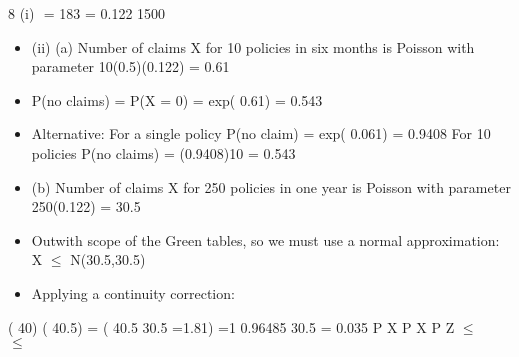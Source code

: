 
8 (i)  = 183 = 0.122
1500

\begin{itemize}
    \item (ii) (a) Number of claims X for 10 policies in six months is Poisson with
parameter 10(0.5)(0.122) = 0.61
\item P(no claims) = P(X = 0) = exp(	0.61) = 0.543
\item Alternative:
For a single policy P(no claim) = exp(	0.061) = 0.9408
For 10 policies P(no claims) = (0.9408)10 = 0.543
\item (b) Number of claims X for 250 policies in one year is Poisson with
parameter 250(0.122) = 30.5
\item Outwith scope of the Green tables, so we must use a normal
approximation:
X $\leq$ N(30.5,30.5)
\item Applying a continuity correction:
\end{itemize}

( 40) ( 40.5) = ( 40.5 30.5 =1.81) =1 0.96485
30.5
= 0.035
P X P X P Z $\leq$
    $\leq$
